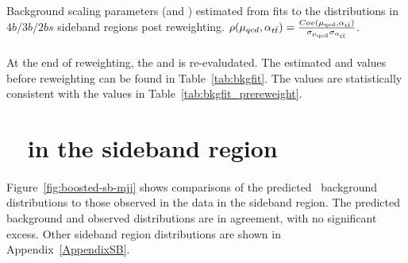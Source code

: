 \begin{table}[htbp!]
\begin{center}
\caption{Background scaling parameters (\muqcd and \alphatt) estimated from fits to the \mleadJ distributions in $4b/3b/2bs$ sideband regions post reweighting. $\rho(\mu_{qcd},\alpha_{t\bar{t}}) = \frac{Cov(\rm \mu_{qcd},\rm \alpha_{\rm t\bar{t}})}{\rm \sigma_{\mu_{qcd}} \rm \sigma_{\alpha_{\rm t\bar{t}}} }$.}

\label{tab:bkgfit}
\end{center}
\end{table}

\paragraph{}
At the end of reweighting, the \muqcd and \alphatt is re-evaludated. The estimated \muqcd and \alphatt values before reweighting can be found in Table~\ref{tab:bkgfit}. 
The values are statistically consistent with the values in Table~\ref{tab:bkgfit_prereweight}.



\section{\mtwoJ~ in the sideband region}
\label{sec:boosted-sb}

\paragraph{}
Figure~\ref{fig:boosted-sb-mjj} shows comparisons of the predicted \mtwoJ~background distributions to those observed in the data in the sideband region.
The predicted background and observed distributions are in agreement, with no significant excess.
Other sideband region distributions are shown in Appendix~\ref{AppendixSB}.

